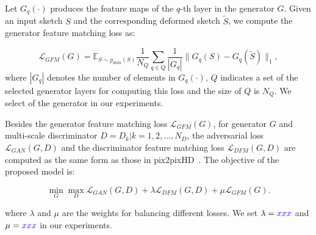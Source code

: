 



Let $G_q(\cdot)$ produces the feature maps of the $q$-th layer in the generator $G$.
%
Given an input sketch $S$ and the corresponding deformed sketch $\tilde{S}$, we compute the generator feature matching loss as:

\begin{equation}
	\label{eqn:loss_GFM}
	\mathcal{L}_{GFM}(G)=\mathbb{E}_{S\sim p_{data}(S)} \frac{1}{N_Q} \sum_{q\in Q}  \frac{1}{|G_q|} \|G_q(S)-G_q(\tilde{S}) \|_1,
\end{equation}
%
where $|G_q|$ denotes the number of elements in $G_q(\cdot)$, $Q$ indicates a set of the selected generator layers for computing this loss and the size of $Q$ is $N_Q$. 
We select  of the generator in our experiments.

Besides the generator feature matching loss $\mathcal{L}_{GFM}(G)$, for generator $G$ and multi-scale discriminator $D={D_k | k=1,2,...,N_D}$, the adversarial loss $\mathcal{L}_{GAN}(G, D)$ and the discriminator feature matching loss $\mathcal{L}_{DFM}(G, D)$ are computed as the same form as those in pix2pixHD~\cite{pix2pixHD}. 
%
The objective of the proposed model is:

\begin{equation}
	\label{eqn:new_minmax_game}
	\min_G \max_{D} \mathcal{L}_{GAN}(G, D)+\lambda \mathcal{L}_{DFM}(G, D) +\mu \mathcal{L}_{GFM}(G).
\end{equation}

where $\lambda$ and $\mu$ are the weights for balancing different losses. We set $\lambda=\textcolor{blue}{xxx}$ and $\mu=\textcolor{blue}{xxx}$ in our experiments.